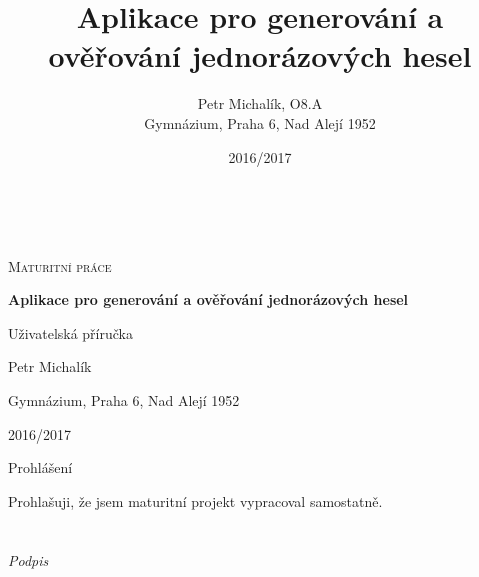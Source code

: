 \documentclass[12pt,opeany,a4paper,oneside]{book}
\author{Petr Michalík, O8.A\\Gymnázium, Praha 6, Nad Alejí 1952}
\title{Aplikace pro generování a ověřování jednorázových hesel}
\date{2016/2017}
\begin{document}
\begin{titlepage}
	\centering	
	{~\par}
	\vspace{4cm}
	{\scshape\LARGE  Maturitní práce  \par}
	\vspace{1cm}
	{\huge\bfseries Aplikace pro generování a ověřování jednorázových hesel \par}
	\vspace{1cm}
	{\large Uživatelská příručka \par}
	\vspace{4cm}
	
	\vfill
	
	{\large Petr Michalík \par}
	{\large Gymnázium, Praha 6, Nad Alejí 1952 \par}
	{\large 2016/2017\par}
\end{titlepage}

\pagestyle{plain}
\setcounter{page}{2}
\justify
{\normalfont\huge Prohlášení}
\vspace{2cm}


Prohlašuji, že jsem maturitní projekt vypracoval samostatně.
\\
\\
\\
{\it Podpis }
\clearpage
\shorthandoff{-}\shorthandon{-}
\end{document}
